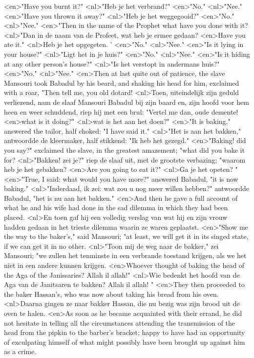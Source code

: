 <en>"Have you burnt it?"
<nl>"Heb je het verbrand?"
<en>"No."
<nl>"Nee."
<en>"Have you thrown it away?"
<nl>"Heb je het weggegooid?"
<en>"No."
<nl>"Nee."
<en>"Then in the name of the Prophet what have you done with it?
<nl>"Dan in de naam van de Profeet, wat heb je ermee gedaan?
<en>Have you ate it."
<nl>Heb je het opgegeten. '
<en>"No."
<nl>"Nee."
<en>"Is it lying in your house?"
<nl>"Ligt het in je huis?"
<en>"No."
<nl>"Nee."
<en>"Is it hiding at any other person's house?"
<nl>"Is het verstopt  in andermans huis?"
<en>"No."
<nl>"Nee."
<en>Then at last quite out of patience, the slave Mansouri took Babadul by his beard, and shaking his head for him, exclaimed with a roar, "Then tell me, you old dotard!
<nl>Toen, uiteindelijk zijn geduld verliezend, nam de slaaf Mansouri Babadul bij zijn baard en, zijn hoofd voor hem heen en weer schuddend, riep hij met een brul: "Vertel  me dan, oude demente!
<en>what is it doing?"
<nl>wat is  het aan het doen?"
<en>"It is baking," answered the tailor, half choked: "I have said it."
<nl>"Het is aan het bakken," antwoordde de kleermaker, half stikkend: "Ik heb het gezegd."
<en>"Baking! did you say?" exclaimed the slave, in the greatest amazement; "what did you bake it for?
<nl>"Bakken! zei je?" riep de slaaf uit, met de grootste verbazing; "waarom heb je het gebakken?
<en>Are you going to eat it?"
<nl>Ga je het opeten? "
<en>"True, I said: what would you have more?" answered Babadul, "it is now baking."
<nl>"Inderdaad, ik zei: wat zou u nog meer willen hebben?" antwoordde Babadul, "het is nu aan het bakken."
<en>And then he gave a full account of what he and his wife had done in the sad dilemma in which they had been placed.
<nl>En toen gaf hij een volledig verslag van wat hij en zijn vrouw hadden gedaan in het trieste dilemma waarin ze waren geplaatst.
<en>"Show me the way to the baker's," said Mansouri; "at least, we will get it in its singed state, if we can get it in no other.
<nl>"Toon mij de weg naar de bakker," zei Mansouri; "we zullen het tenminste in een verbrande toestand krijgen, als we het niet in een andere kunnen krijgen.
<en>Whoever thought of baking the head of the Aga of the Janissaries? Allah il allah!"
<nl>Wie bedenkt het hoofd van de Aga van de Janitsaren te bakken? Allah il allah! "
<en>They then proceeded to the baker Hassan's, who was now about taking his bread from his oven.
<nl>Daarna gingen ze naar bakker Hassan, die nu bezig was zijn brood uit de oven te halen.
<en>As soon as he became acquainted with their errand, he did not hesitate in telling all the circumstances attending the transmission of the head from the pipkin to the barber's bracket; happy to have had an opportunity of exculpating himself of what might possibly have been brought up against him as a crime.
